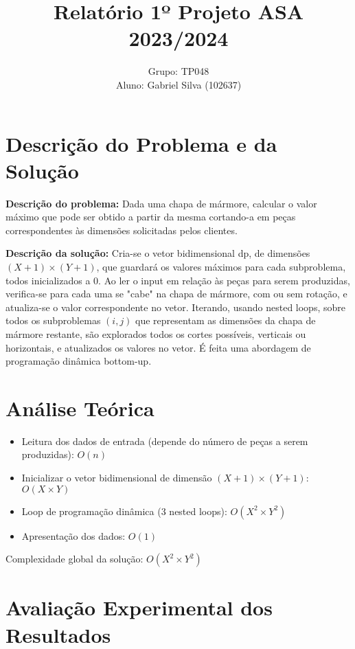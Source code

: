 \documentclass[12pt]{article}
\begin{document}
\title{Relatório 1º Projeto ASA 2023/2024}
\author{Grupo: TP048 \\ Aluno: Gabriel Silva (102637)}
\date{}
\maketitle

\section{Descrição do Problema e da Solução}

\textbf{Descrição do problema:} Dada uma chapa de mármore, calcular o valor máximo que pode ser obtido a partir da mesma cortando-a em peças correspondentes às dimensões solicitadas pelos clientes.

\textbf{Descrição da solução:} Cria-se o vetor bidimensional dp, de dimensões $(X + 1) \times (Y + 1)$, que guardará os valores máximos para cada subproblema, todos inicializados a 0. Ao ler o input em relação às peças para serem produzidas, verifica-se para cada uma se "cabe" na chapa de mármore, com ou sem rotação, e atualiza-se o valor correspondente no vetor. Iterando, usando nested loops, sobre todos os subproblemas $(i, j)$ que representam as dimensões da chapa de mármore restante, são explorados todos os cortes possíveis, verticais ou horizontais, e atualizados os valores no vetor. É feita uma abordagem de programação dinâmica bottom-up.

\section{Análise Teórica}

\begin{itemize}
    \item Leitura dos dados de entrada (depende do número de peças a serem produzidas): $O(n)$
    \item Inicializar o vetor bidimensional de dimensão $(X + 1) \times (Y + 1)$: $O(X \times Y)$
    \item Loop de programação dinâmica (3 nested loops): $O(X^2 \times Y^2)$
    \item Apresentação dos dados: $O(1)$
\end{itemize}

Complexidade global da solução: $O(X^2 \times Y^2)$

\section{Avaliação Experimental dos Resultados}
\end{document}
